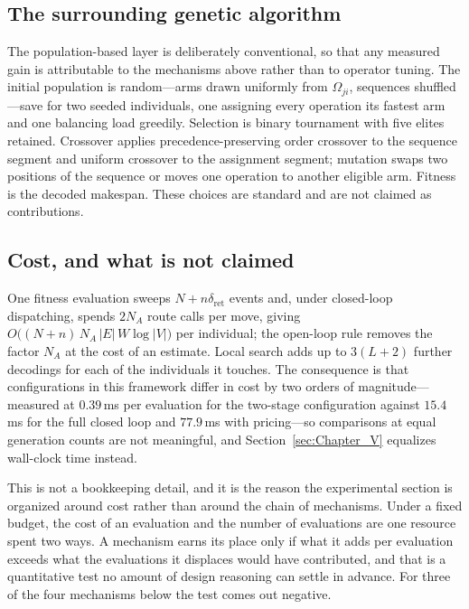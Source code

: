 \documentclass[manuscript,screen,review]{acmart}
\begin{document}
\subsection{The surrounding genetic algorithm}

The population-based layer is deliberately conventional, so that any measured
gain is attributable to the mechanisms above rather than to operator tuning.
The initial population is random---arms drawn uniformly from $\Omega_{ji}$,
sequences shuffled---save for two seeded individuals, one assigning every
operation its fastest arm and one balancing load greedily. Selection is binary
tournament with five elites retained. Crossover applies precedence-preserving
order crossover to the sequence segment and uniform crossover to the assignment
segment; mutation swaps two positions of the sequence or moves one operation to
another eligible arm. Fitness is the decoded makespan. These choices are
standard and are not claimed as contributions.

\subsection{Cost, and what is not claimed}

One fitness evaluation sweeps $N+n\delta_{\mathrm{ret}}$ events and, under
closed-loop dispatching, spends $2N_A$ route calls per move, giving
$O\bigl((N+n)\,N_A\,|E|\,W\log|V|\bigr)$ per individual; the open-loop rule
removes the factor $N_A$ at the cost of an estimate. Local search adds up to
$3(L+2)$ further decodings for each of the individuals it touches. The
consequence is that configurations in this framework differ in cost by two orders
of magnitude---measured at $0.39$\,ms per evaluation for the two-stage
configuration against $15.4$\,ms for the full closed loop and $77.9$\,ms with
pricing---so comparisons at equal generation counts are not meaningful, and
Section~\ref{sec:Chapter_V} equalizes wall-clock time instead.

This is not a bookkeeping detail, and it is the reason the experimental section is
organized around cost rather than around the chain of mechanisms. Under a fixed
budget, the cost of an evaluation and the number of evaluations are one resource
spent two ways. A mechanism earns its place only if what it adds per evaluation
exceeds what the evaluations it displaces would have contributed, and that is a
quantitative test no amount of design reasoning can settle in advance. For three
of the four mechanisms below the test comes out negative.
\end{document}
